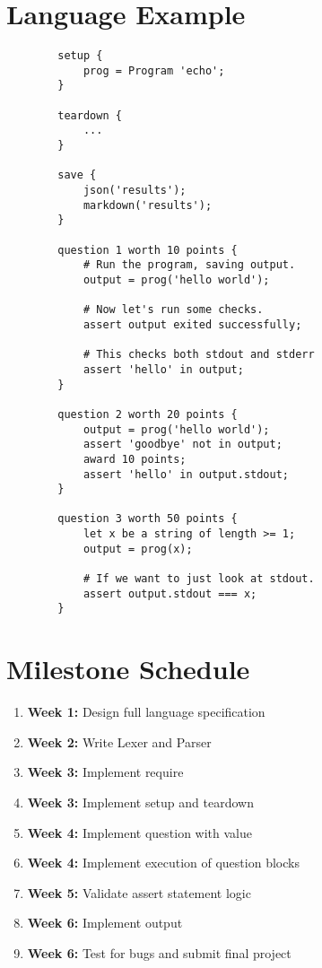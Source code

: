 \documentclass{article}
\begin{document}
    \section{Language Example}
    \begin{lstlisting}
        setup {
            prog = Program 'echo';
        }

        teardown {
            ...
        }

        save {
            json('results');
            markdown('results');
        }

        question 1 worth 10 points {
            # Run the program, saving output.
            output = prog('hello world');

            # Now let's run some checks.
            assert output exited successfully;
            
            # This checks both stdout and stderr
            assert 'hello' in output;
        }

        question 2 worth 20 points {
            output = prog('hello world');
            assert 'goodbye' not in output;
            award 10 points;
            assert 'hello' in output.stdout;
        }

        question 3 worth 50 points {
            let x be a string of length >= 1;
            output = prog(x);

            # If we want to just look at stdout.
            assert output.stdout === x;
        }
    \end{lstlisting}

    \section{Milestone Schedule}
    \begin{enumerate}
        \item {\bf Week 1:} Design full language specification
        \item {\bf Week 2:} Write Lexer and Parser
        \item {\bf Week 3:} Implement require
        \item{\bf Week 3:}  Implement setup and teardown
        \item {\bf Week 4:} Implement question with value
        \item {\bf Week 4:} Implement execution of question blocks
        \item {\bf Week 5:} Validate assert statement logic
        \item {\bf Week 6:} Implement output
        \item {\bf Week 6:} Test for bugs and submit final project
    \end{enumerate}
\end{document}
